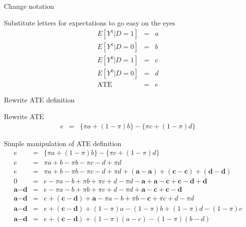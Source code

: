\documentclass{beamer}
\begin{document}
\begin{frame}{Change notation}



  \begin{block}{Substitute letters for expectations to go easy on the eyes}
    \begin{eqnarray*}
      E[Y^1|D=1] &=& a  \\
      E[Y^1|D=0] &=& b  \\
      E[Y^0|D=1] &=& c  \\
      E[Y^0|D=0] &=& d  \\
      \text{ATE} &=& e
    \end{eqnarray*}
  \end{block}


\end{frame}

\begin{frame}{Rewrite ATE definition}


  \begin{block}{Rewrite ATE}
    \begin{eqnarray*}
      e&=&\{\pi{a} + (1-\pi)b\} - \{\pi{c} + (1-\pi)d\}
    \end{eqnarray*}
  \end{block}

\end{frame}




\begin{frame}[plain]

  \begin{block}{Simple manipulation of ATE definition}
    \begin{eqnarray*}
      e&=&\{\pi{a} + (1-\pi)b\} - \{\pi{c} + (1-\pi)d\}  \\
      e&=&\pi{a} + b - \pi{b} - \pi{c} - d + \pi{d}  \\
      e&=&\pi{a} + b - \pi{b} - \pi{c} - d + \pi{d} + (\textbf{a} - \textbf{a}) + (\textbf{c} - \textbf{c}) + (\textbf{d} - \textbf{d})  \\
      0&=&e-\pi{a} - b + \pi{b} + \pi{c} + d - \pi{d} - \textbf{a} + \textbf{a} - \textbf{c} + \textbf{c} - \textbf{d} + \textbf{d}  \\
      \textbf{a}-\textbf{d}&=&e-\pi{a} - b + \pi{b} + \pi{c} + d - \pi{d}  + \textbf{a} - \textbf{c} + \textbf{c} - \textbf{d}  \\
      \textbf{a}-\textbf{d}&=&e  + (\textbf{c} - \textbf{d}) + \textbf{a}-\pi{a} - b + \pi{b} - \textbf{c} + \pi{c} + d - \pi{d} \\
      \textbf{a}-\textbf{d}&=&e  + (\textbf{c} - \textbf{d}) + (1-\pi)a -(1-\pi)b + (1-\pi)d - (1-\pi)c  \\
      \textbf{a}-\textbf{d}&=&e  + (\textbf{c} - \textbf{d}) + (1-\pi)(a-c) -(1-\pi)(b-d)
    \end{eqnarray*}
  \end{block}


\end{frame}
\end{document}
